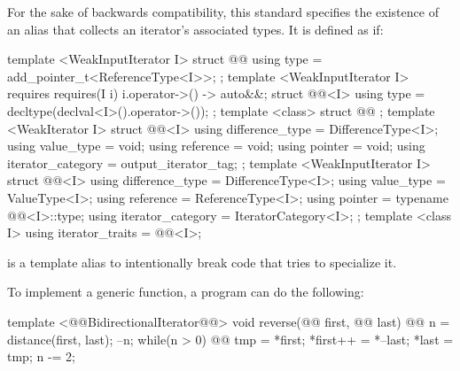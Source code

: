 \begin{addedblock}
\pnum
For the sake of backwards compatibility, this standard specifies the existence of an 
alias that collects an iterator's associated types. It is defined as if:

%
\begin{codeblock}
  template <WeakInputIterator I> struct @@ {
    using type = add_pointer_t<ReferenceType<I>>;
  };
  template <WeakInputIterator I>
    requires requires(I i) { { i.operator->() } -> auto&&; }
  struct @@<I> {
    using type = decltype(declval<I>().operator->());
  };
  template <class> struct @@ { };
  template <WeakIterator I> struct @@<I> {
    using difference_type = DifferenceType<I>;
    using value_type = void;
    using reference = void;
    using pointer = void;
    using iterator_category = output_iterator_tag;
  };
  template <WeakInputIterator I> struct @@<I> {
    using difference_type = DifferenceType<I>;
    using value_type = ValueType<I>;
    using reference = ReferenceType<I>;
    using pointer = typename @@<I>::type;
    using iterator_category = IteratorCategory<I>;
  };
  template <class I>
    using iterator_traits = @@<I>;
\end{codeblock}

\pnum
\enternote
{} is a template alias to intentionally break code that tries to specialize
it.
\exitnote

\end{addedblock}

\pnum
\enterexample
To implement a generic
function, a \Cpp program can do the following:

\begin{codeblock}
template <@@BidirectionalIterator@@>
void reverse(@@ first, @@ last) {
  @@ n =
    distance(first, last);
  --n;
  while(n > 0) {
    @@
      tmp = *first;
    *first++ = *--last;
    *last = tmp;
    n -= 2;
  }
}
\end{codeblock}
\exitexample

